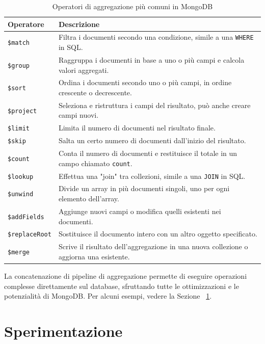 \documentclass{article}
\begin{document}
\begin{table}[H]
    \centering
    \begin{tabular}{|l|p{10cm}|}
    \hline
    \textbf{Operatore} & \textbf{Descrizione} \\
    \hline
    \texttt{\$match} & Filtra i documenti secondo una condizione, simile a una \texttt{WHERE} in SQL. \\
    \hline
    \texttt{\$group} & Raggruppa i documenti in base a uno o più campi e calcola valori aggregati. \\
    \hline
    \texttt{\$sort} & Ordina i documenti secondo uno o più campi, in ordine crescente o decrescente. \\
    \hline
    \texttt{\$project} & Seleziona e ristruttura i campi del risultato, può anche creare campi nuovi. \\
    \hline
    \texttt{\$limit} & Limita il numero di documenti nel risultato finale. \\
    \hline
    \texttt{\$skip} & Salta un certo numero di documenti dall'inizio del risultato. \\
    \hline
    \texttt{\$count} & Conta il numero di documenti e restituisce il totale in un campo chiamato \texttt{count}. \\
    \hline
    \texttt{\$lookup} & Effettua una "join" tra collezioni, simile a una \texttt{JOIN} in SQL. \\
    \hline
    \texttt{\$unwind} & Divide un array in più documenti singoli, uno per ogni elemento dell’array. \\
    \hline
    \texttt{\$addFields} & Aggiunge nuovi campi o modifica quelli esistenti nei documenti. \\
    \hline
    \texttt{\$replaceRoot} & Sostituisce il documento intero con un altro oggetto specificato. \\
    \hline
    \texttt{\$merge} & Scrive il risultato dell’aggregazione in una nuova collezione o aggiorna una esistente. \\
    \hline
    \end{tabular}
    \caption{Operatori di aggregazione più comuni in MongoDB}
    \label{tab:operatori_aggregazione}
\end{table}
La concatenazione di pipeline di aggregazione permette di eseguire operazioni complesse direttamente sul database, sfruttando tutte le
ottimizzazioni e le potenzialità di MongoDB. Per alcuni esempi, vedere la Sezione ~\ref{sec:Sperimentazione}.
    
\section{Sperimentazione}
\label{sec:Sperimentazione}
\end{document}
